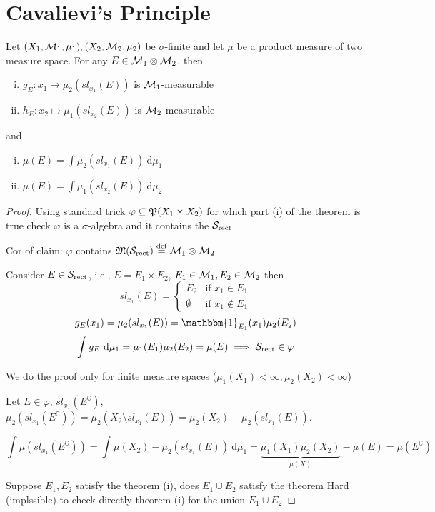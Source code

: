 \section{Cavalievi's Principle}

\begin{theorem}
  Let $(X_1, \mathcal M_1, \mu_1), (X_2, \mathcal M_2, \mu_2)$ be $\sigma$-finite and let $\mu$  be a product measure of two measure space.
  For any $E \in \mathcal M_1 \otimes \mathcal M_2$, then
  \begin{enumerate}[(i)]
    \item $g_E : x_1 \mapsto \mu_2(sl_{x_1}(E))$ is $\mathcal M_1$-measurable
    \item $h_E : x_2 \mapsto \mu_1(sl_{x_2}(E))$ is $\mathcal M_2$-measurable
  \end{enumerate}
  and 
  \begin{enumerate}[(i)]
    \item $\mu(E) = \int \mu_2(sl_{x_1}(E)) \ \mathrm{d}\mu_1$
    \item $\mu(E) = \int \mu_1(sl_{x_2}(E)) \ \mathrm{d}\mu_2$
  \end{enumerate}
\end{theorem}

\begin{proof}
  Using standard trick $\varphi \subseteq \mathfrak P(X_1 \times X_2)$ for which part (i) of the theorem is true
  check $\varphi$ is a $\sigma$-algebra and it contains the $\mathcal S_{\text{rect}}$

  Cor of claim: $\varphi$ contains $\mathfrak M(\mathcal S_{\text{rect}}) \overset{\text{def}}{=} \mathcal M_1 \otimes \mathcal M_2$

  Consider $E \in \mathcal S_{\text{rect}}$, i.e., $E = E_1 \times E_2$, $E_1 \in \mathcal M_1, E_2 \in \mathcal M_2$
  then \[sl_{x_1}(E) = \begin{cases}
    E_2  & \text{if } x_1 \in E_1 \\
    \emptyset & \text{if } x_1 \notin E_1
  \end{cases}\]
  \[g_E(x_1) = \mu_2(sl_{x_1}(E)) = \mathbbm{1}_{E_1}(x_1) \mu_2(E_2)\]
  \[\int g_E \ \mathrm{d}\mu_1 = \mu_1(E_1)\mu_2(E_2) = \mu(E)\implies \mathcal S_{\text{rect}} \in \varphi\]

  We do the proof only for finite measure spaces ($\mu_1(X_1) < \infty, \mu_2(X_2) < \infty$)

  Let $E \in \varphi$, $sl_{x_1}(E^\complement)$, $\mu_2(sl_{x_1}(E^\complement)) = \mu_2(X_2 \setminus sl_{x_1}(E)) = \mu_2(X_2) - \mu_2(sl_{x_1}(E))$.

  \[\int \mu(sl_{x_1}(E^\complement)) = \int \mu(X_2) - \mu_2(sl_{x_1}(E)) \ \mathrm{d}\mu_1 = \underbrace{\mu_1(X_1)\mu_2(X_2)}_{\mu(X)} - \mu(E) = \mu(E^\complement)\]

  Suppose $E_1, E_2$ satisfy the theorem (i), does $E_1 \cup E_2$ satisfy the theorem
  Hard (implssible) to check directly theorem (i) for the union $E_1 \cup E_2$ 
\end{proof}

